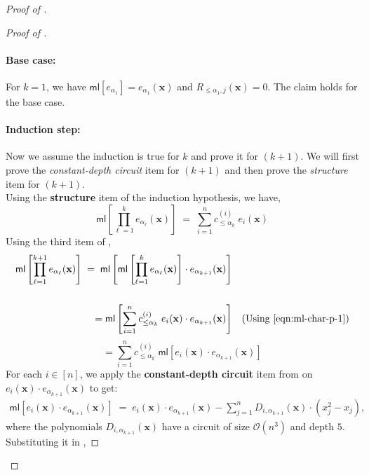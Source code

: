 \documentclass[11pt]{article}
\newcommand{\bigO}{\mathcal{O}}
\newcommand{\brac}[1]{\left[ #1 \right]}
\newcommand{\ml}{\mathsf{ml}}
\begin{document}
\begin{proof}[Proof of ]
\begin{proof}[Proof of ]
\paragraph{Base case:}For $k = 1$, we have $\ml[e_{\alpha_{1}}] = e_{\alpha_{1}}(\mathbf{x})$ and $R_{\leq \alpha_{1}, j}(\mathbf{x}) = 0$. The claim holds for the base case.

\paragraph{Induction step:}Now we assume the induction is true for $k$ and prove it for $(k+1)$. We will first prove the \emph{constant-depth circuit} item for $(k+1)$ and then prove the \emph{structure} item for $(k+1)$.\\

\noindent
Using the \textbf{structure} item of the induction hypothesis, we have,
\begin{equation}\label{eqn:ml-char-p-1}
    \ml\brac{\prod_{\ell = 1}^{k} e_{\alpha_{\ell}}(\mathbf{x})} \; = \; \sum_{i=1}^{n} c_{\leq \alpha_{k}}^{(i)} \; e_{i}(\mathbf{x})
\end{equation}
Using the third item of ,
\begin{align*}
    \ml\brac{\prod_{\ell = 1}^{k+1} e_{\alpha_{\ell}}(\mathbf{x})} \; = \; \ml\brac{\ml\brac{\prod_{\ell = 1}^{k} e_{\alpha_{\ell}}(\mathbf{x})} \cdot e_{\alpha_{k+1}}(\mathbf{x})} \\ \\
    = \ml\brac{\sum_{i = 1}^{n} c_{\leq \alpha_{k}}^{(i)} \; e_{i}(\mathbf{x}) \cdot e_{\alpha_{k+1}}(\mathbf{x}) } && (\text{Using \Cref{eqn:ml-char-p-1}}) 
\end{align*}
\begin{equation}\label{eqn:partial-ml-8}
    = \sum_{i = 1}^{n} c_{\leq \alpha_{k}}^{(i)} \; \ml[e_{i}(\mathbf{x}) \cdot e_{\alpha_{k+1}}(\mathbf{x}) ]
\end{equation}
For each $i \in [n]$, we apply the \textbf{constant-depth circuit} item from  on $e_{i}(\mathbf{x}) \cdot e_{\alpha_{k+1}}(\mathbf{x})$ to get:
\begin{align*}
    \ml[e_{i}(\mathbf{x}) \cdot e_{\alpha_{k+1}}(\mathbf{x})] \; = \; e_{i}(\mathbf{x}) \cdot e_{\alpha_{k+1}}(\mathbf{x}) - \sum_{j=1}^{n} D_{i,\alpha_{k+1}}(\mathbf{x}) \cdot (x_{j}^{2} - x_{j}),
\end{align*}
where the polynomials $D_{i,\alpha_{k+1}}(\mathbf{x})$ have a circuit of size $\bigO(n^{3})$ and depth $5$. Substituting it in ,

\end{proof}
\end{proof}
\end{document}
